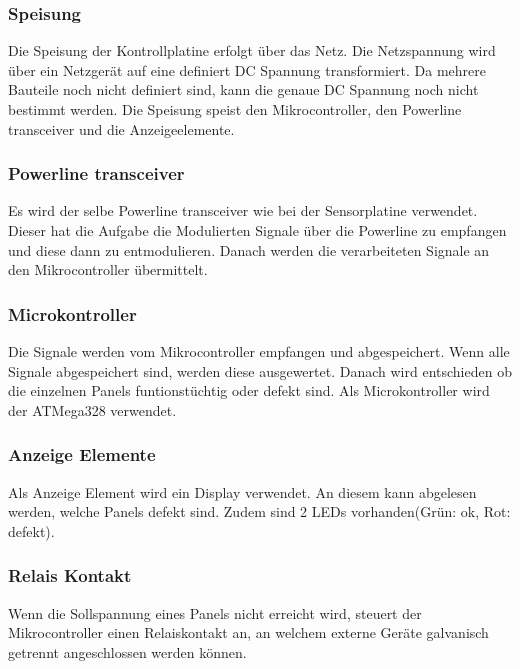 \subsubsection{Speisung}
Die Speisung der Kontrollplatine erfolgt über das Netz. Die Netzspannung wird über ein Netzgerät auf eine definiert DC Spannung transformiert. 
Da mehrere Bauteile noch nicht definiert sind, kann die genaue DC Spannung noch nicht bestimmt werden. Die Speisung speist den Mikrocontroller, den Powerline transceiver und die Anzeigeelemente.

\subsubsection{Powerline transceiver}
Es wird der selbe Powerline transceiver wie bei der Sensorplatine verwendet. Dieser hat die Aufgabe die Modulierten Signale über die Powerline zu empfangen und diese dann zu entmodulieren. Danach werden die verarbeiteten Signale an den Mikrocontroller übermittelt.

\subsubsection{Microkontroller}
Die Signale werden vom Mikrocontroller empfangen und abgespeichert. Wenn alle Signale abgespeichert sind, werden diese ausgewertet. Danach wird entschieden ob die einzelnen Panels funtionstüchtig oder defekt sind. Als Microkontroller wird der ATMega328 verwendet.

\subsubsection{Anzeige Elemente}
Als Anzeige Element wird ein Display verwendet. An diesem kann abgelesen werden, welche Panels defekt sind. Zudem sind 2 LEDs vorhanden(Grün: ok, Rot: defekt).

\subsubsection{Relais Kontakt}
Wenn die Sollspannung eines Panels nicht erreicht wird, steuert der Mikrocontroller einen Relaiskontakt an, an welchem externe Geräte galvanisch getrennt angeschlossen werden können.

%
